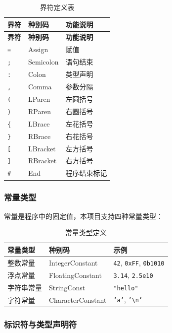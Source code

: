 \documentclass[12pt,a4paper]{ctexart}
\begin{document}
\begin{longtable}{|l|l|l|}
\caption{界符定义表} \label{tab:delimiters} \\
\hline
\textbf{界符} & \textbf{种别码} & \textbf{功能说明} \\
\hline
\endfirsthead
\hline
\textbf{界符} & \textbf{种别码} & \textbf{功能说明} \\
\hline
\endhead
\hline
\endfoot
\hline
\endlastfoot

\texttt{=} & Assign & 赋值 \\
\texttt{;} & Semicolon & 语句结束 \\
\texttt{:} & Colon & 类型声明 \\
\texttt{,} & Comma & 参数分隔 \\
\texttt{(} & LParen & 左圆括号 \\
\texttt{)} & RParen & 右圆括号 \\
\texttt{\{} & LBrace & 左花括号 \\
\texttt{\}} & RBrace & 右花括号 \\
\texttt{[} & LBracket & 左方括号 \\
\texttt{]} & RBracket & 右方括号 \\
\texttt{\#} & End & 程序结束标记 \\
\end{longtable}

\subsubsection{常量类型}

常量是程序中的固定值，本项目支持四种常量类型：

\begin{table}[H]
\centering
\caption{常量类型定义}
\begin{tabular}{|l|l|l|}
\hline
\textbf{常量类型} & \textbf{种别码} & \textbf{示例} \\
\hline
整数常量 & IntegerConstant & \texttt{42}, \texttt{0xFF}, \texttt{0b1010} \\
\hline
浮点常量 & FloatingConstant & \texttt{3.14}, \texttt{2.5e10} \\
\hline
字符串常量 & StringConst & \texttt{"hello"} \\
\hline
字符常量 & CharacterConstant & \texttt{'a'}, \texttt{'\textbackslash n'} \\
\hline
\end{tabular}
\end{table}

\subsubsection{标识符与类型声明符}
\end{document}
